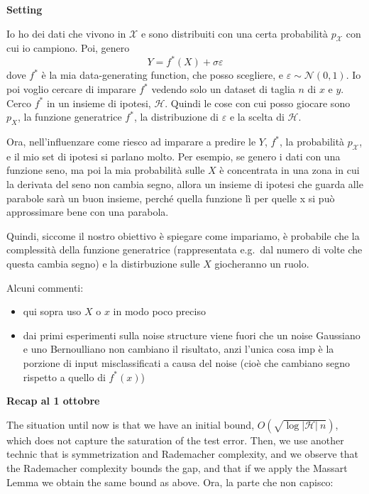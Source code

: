 \documentclass{amsart}
\begin{document}
\bigskip

{\bf\Large Setting}


Io ho dei dati che vivono in $\mathcal X$ e sono distribuiti con una certa probabilità $p_{\mathcal X}$ con cui io campiono. Poi, genero 
\[
Y = f^*(X) + \sigma\varepsilon
\]
dove $f^*$ è la mia data-generating function, che posso scegliere, e $\varepsilon \sim \mathcal N(0, 1)$. 
Io poi voglio cercare di imparare $f^*$ vedendo solo un dataset di taglia $n$ di $x$ e $y$. Cerco $f^*$ in un insieme di ipotesi, $\mathcal H$. Quindi le cose con cui posso giocare sono  $p_X$, la funzione generatrice $f^*$, la distribuzione di $\varepsilon$ e la scelta di $\mathcal H$. 

Ora, nell'influenzare come riesco ad imparare a predire le $Y$, $f^*$, la probabilità $p_{\mathcal X}$, e il mio set di ipotesi si parlano molto. Per esempio, se genero i dati con una funzione seno, ma poi la mia probabilità sulle $X$ è concentrata in una zona in cui la derivata del seno non cambia segno, allora un insieme di ipotesi che guarda alle parabole sarà un buon insieme, perché quella funzione lì per quelle x si può approssimare bene con una parabola. 

Quindi, siccome il nostro obiettivo è spiegare come impariamo, è probabile che la complessità della funzione generatrice (rappresentata e.g.\ dal numero di volte che questa cambia segno) e la distirbuzione sulle $X$ giocheranno un ruolo. 

\bigskip

Alcuni commenti:
\begin{itemize}
    \item[$\cdot$] qui sopra uso $X$ o $x$ in modo poco preciso
    \item[$\cdot$] dai primi esperimenti sulla noise structure viene fuori che un noise Gaussiano e uno Bernoulliano non cambiano il risultato, anzi l'unica cosa imp è la porzione di input misclassificati a causa del noise (cioè che cambiano segno rispetto a quello di $f^*(x)$)
\end{itemize}

\bigskip

{\bf\Large Recap al 1 ottobre}

The situation until now is that we have an initial bound, $O(\sqrt{\log \vert\mathcal H\vert \ n})$, which does not capture the saturation of the test error. Then, we use another technic that is symmetrization and Rademacher complexity, and we observe that the Rademacher complexity bounds the gap, and that if we apply the Massart Lemma we obtain the same bound as above. Ora, la parte che non capisco:
\end{document}
